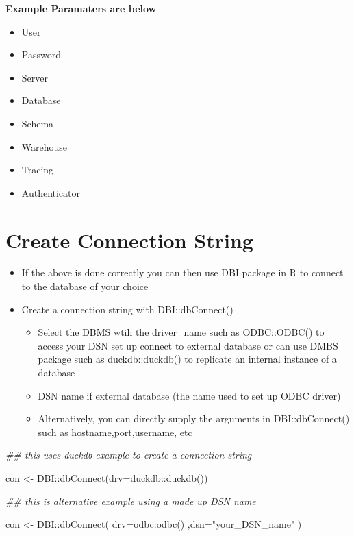 \documentclass[
  letterpaper,
  DIV=11,
  numbers=noendperiod]{scrreprt}
\newenvironment{Shaded}{\begin{snugshade}}{\end{snugshade}}
\newcommand{\AttributeTok}[1]{\textcolor[rgb]{0.40,0.45,0.13}{#1}}
\newcommand{\DocumentationTok}[1]{\textcolor[rgb]{0.37,0.37,0.37}{\textit{#1}}}
\newcommand{\FunctionTok}[1]{\textcolor[rgb]{0.28,0.35,0.67}{#1}}
\newcommand{\NormalTok}[1]{\textcolor[rgb]{0.00,0.23,0.31}{#1}}
\newcommand{\OtherTok}[1]{\textcolor[rgb]{0.00,0.23,0.31}{#1}}
\newcommand{\SpecialCharTok}[1]{\textcolor[rgb]{0.37,0.37,0.37}{#1}}
\newcommand{\StringTok}[1]{\textcolor[rgb]{0.13,0.47,0.30}{#1}}
\providecommand{\tightlist}{%
  \setlength{\itemsep}{0pt}\setlength{\parskip}{0pt}}\usepackage{longtable,booktabs,array}
\begin{document}
\textbf{Example Paramaters are below}

\begin{itemize}
\tightlist
\item
  User
\item
  Password
\item
  Server
\item
  Database
\item
  Schema
\item
  Warehouse\\
\item
  Tracing
\item
  Authenticator
\end{itemize}

\section{Create Connection String}\label{create-connection-string}

\begin{itemize}
\item
  If the above is done correctly you can then use DBI package in R to
  connect to the database of your choice
\item
  Create a connection string with DBI::dbConnect()

  \begin{itemize}
  \item
    Select the DBMS wtih the driver\_name such as ODBC::ODBC() to access
    your DSN set up connect to external database or can use DMBS package
    such as duckdb::duckdb() to replicate an internal instance of a
    database
  \item
    DSN name if external database (the name used to set up ODBC driver)
  \item
    Alternatively, you can directly supply the arguments in
    DBI::dbConnect() such as hostname,port,username, etc
  \end{itemize}
\end{itemize}

\begin{Shaded}
\begin{Highlighting}[]
\DocumentationTok{\#\# this uses duckdb example to create a connection string}

\NormalTok{con }\OtherTok{\textless{}{-}}\NormalTok{ DBI}\SpecialCharTok{::}\FunctionTok{dbConnect}\NormalTok{(}\AttributeTok{drv=}\NormalTok{duckdb}\SpecialCharTok{::}\FunctionTok{duckdb}\NormalTok{())}

\DocumentationTok{\#\# this is alternative example using a made up DSN name }

\NormalTok{con  }\OtherTok{\textless{}{-}}\NormalTok{ DBI}\SpecialCharTok{::}\FunctionTok{dbConnect}\NormalTok{(}
  \AttributeTok{drv=}\NormalTok{odbc}\SpecialCharTok{:}\FunctionTok{odbc}\NormalTok{()}
\NormalTok{  ,}\AttributeTok{dsn=}\StringTok{"your\_DSN\_name"} 
\NormalTok{  )}
\end{Highlighting}
\end{Shaded}
\end{document}
